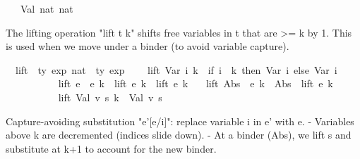 \begin{isabellebody}
\ \ {\isacharbar}{\kern0pt}\ Val\ nat\ nat%
\begin{isamarkuptext}%
The lifting operation "lift t k" shifts free variables in t that are >= k by 1.
  This is used when we move under a binder (to avoid variable capture).%
\end{isamarkuptext}\isamarkuptrue%
\isamarkupfalse%
\isanewline
\ \ lift\ {\isacharcolon}{\kern0pt}{\isacharcolon}{\kern0pt}\ {\isachardoublequoteopen}{\isacharbrackleft}{\kern0pt}{\isacharprime}{\kern0pt}ty\ exp{\isacharcomma}{\kern0pt}\ nat{\isacharbrackright}{\kern0pt}\ {\isacharequal}{\kern0pt}{\isachargreater}{\kern0pt}\ {\isacharprime}{\kern0pt}ty\ exp{\isachardoublequoteclose}\isanewline
{}\isanewline
\ \ \ \ {\isachardoublequoteopen}lift\ {\isacharparenleft}{\kern0pt}Var\ i{\isacharparenright}{\kern0pt}\ k\ {\isacharequal}{\kern0pt}\ {\isacharparenleft}{\kern0pt}if\ i\ {\isacharless}{\kern0pt}\ k\ then\ Var\ i\ else\ Var\ {\isacharparenleft}{\kern0pt}i\ {\isacharplus}{\kern0pt}\ {}{\isacharparenright}{\kern0pt}{\isacharparenright}{\kern0pt}{\isachardoublequoteclose}\isanewline
\ \ \ \ \ \ \ \isanewline
\ \ {\isacharbar}{\kern0pt}\ {\isachardoublequoteopen}lift\ {\isacharparenleft}{\kern0pt}e{}\ {\isasymcdot}\ e{}{\isacharparenright}{\kern0pt}\ k\ {\isacharequal}{\kern0pt}\ lift\ e{}\ k\ {\isasymcdot}\ lift\ e{}\ k{\isachardoublequoteclose}\isanewline
\ \ {\isacharbar}{\kern0pt}\ {\isachardoublequoteopen}lift\ {\isacharparenleft}{\kern0pt}Abs\ {\isasymtau}\ e{\isacharparenright}{\kern0pt}\ k\ {\isacharequal}{\kern0pt}\ Abs\ {\isasymtau}\ {\isacharparenleft}{\kern0pt}lift\ e\ {\isacharparenleft}{\kern0pt}k\ {\isacharplus}{\kern0pt}\ {}{\isacharparenright}{\kern0pt}{\isacharparenright}{\kern0pt}{\isachardoublequoteclose}\isanewline
\ \ \ \ \ \ \ \isanewline
\ \ {\isacharbar}{\kern0pt}\ {\isachardoublequoteopen}lift\ {\isacharparenleft}{\kern0pt}Val\ v\ s{\isacharparenright}{\kern0pt}\ k\ {\isacharequal}{\kern0pt}\ Val\ v\ s{\isachardoublequoteclose}%
\begin{isamarkuptext}%
Capture-avoiding substitution "e'[e/i]": replace variable i in e' with e.
  - Variables above k are decremented (indices slide down).
  - At a binder (Abs), we lift s and substitute at k+1 to account for the new binder.%
\end{isamarkuptext}\isamarkuptrue%
\isamarkupfalse%
\isanewline

\end{isabellebody}
